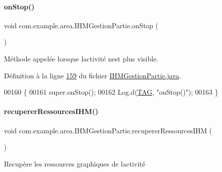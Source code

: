 \paragraph{\texorpdfstring{on\+Stop()}{onStop()}}
{\footnotesize\ttfamily void com.\+example.\+area.\+I\+H\+M\+Gestion\+Partie.\+on\+Stop (\begin{DoxyParamCaption}{ }\end{DoxyParamCaption})\hspace{0.3cm}{\ttfamily [protected]}}



Méthode appelée lorsque l\textquotesingle{}activité n\textquotesingle{}est plus visible. 



Définition à la ligne \hyperlink{_i_h_m_gestion_partie_8java_source_l00159}{159} du fichier \hyperlink{_i_h_m_gestion_partie_8java_source}{I\+H\+M\+Gestion\+Partie.\+java}.


\begin{DoxyCode}
00160     \{
00161         super.onStop();
00162         Log.d(\hyperlink{classcom_1_1example_1_1area_1_1_i_h_m_gestion_partie_a78af1eb84e4a48b7f69c3ebee193933c}{TAG}, \textcolor{stringliteral}{"onStop()"});
00163     \}
\end{DoxyCode}
\mbox{\label{classcom_1_1example_1_1area_1_1_i_h_m_gestion_partie_a2161909470bc787c850df7266c44a0c2}} 
\paragraph{\texorpdfstring{recuperer\+Ressources\+I\+H\+M()}{recupererRessourcesIHM()}}
{\footnotesize\ttfamily void com.\+example.\+area.\+I\+H\+M\+Gestion\+Partie.\+recuperer\+Ressources\+I\+HM (\begin{DoxyParamCaption}{ }\end{DoxyParamCaption})\hspace{0.3cm}{\ttfamily [private]}}



Recupère les ressources graphiques de l\textquotesingle{}activité 



